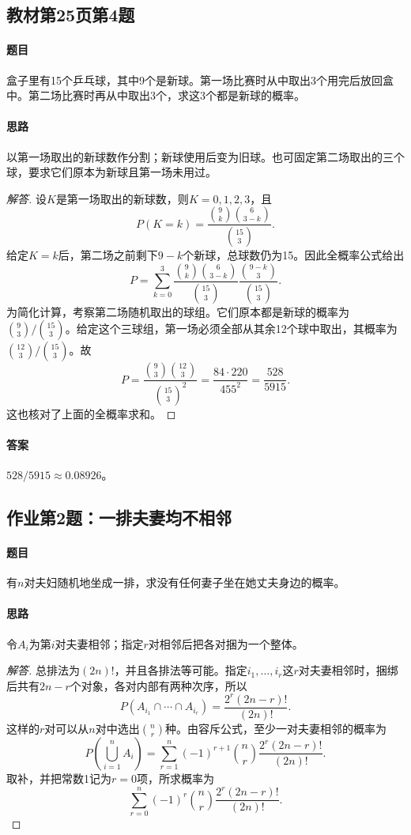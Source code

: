 \subsection{教材第25页第4题}\label{ex:w03-t254}
\paragraph{题目}
盒子里有15个乒乓球，其中9个是新球。第一场比赛时从中取出3个用完后放回盒中。第二场比赛时再从中取出3个，求这3个都是新球的概率。
\paragraph{思路}以第一场取出的新球数作分割；新球使用后变为旧球。也可固定第二场取出的三个球，要求它们原本为新球且第一场未用过。
\begin{proof}[解答]
设$K$是第一场取出的新球数，则$K=0,1,2,3$，且
\[P(K=k)=\frac{\binom9k\binom6{3-k}}{\binom{15}3}.\]
给定$K=k$后，第二场之前剩下$9-k$个新球，总球数仍为15。因此全概率公式给出
\[P=\sum_{k=0}^3\frac{\binom9k\binom6{3-k}}{\binom{15}3}
\frac{\binom{9-k}3}{\binom{15}3}.\]
为简化计算，考察第二场随机取出的球组。它们原本都是新球的概率为$\binom93/\binom{15}3$。给定这个三球组，第一场必须全部从其余12个球中取出，其概率为$\binom{12}3/\binom{15}3$。故
\[P=\frac{\binom93\binom{12}3}{\binom{15}3^2}
=\frac{84\cdot220}{455^2}=\frac{528}{5915}.\]
这也核对了上面的全概率求和。
\end{proof}
\paragraph{答案}$528/5915\approx0.08926$。

\subsection{作业第2题：一排夫妻均不相邻}\label{ex:w03-h2}
\paragraph{题目}
有$n$对夫妇随机地坐成一排，求没有任何妻子坐在她丈夫身边的概率。
\paragraph{思路}令$A_i$为第$i$对夫妻相邻；指定$r$对相邻后把各对捆为一个整体。
\begin{proof}[解答]
总排法为$(2n)!$，并且各排法等可能。指定$i_1,\ldots,i_r$这$r$对夫妻相邻时，捆绑后共有$2n-r$个对象，各对内部有两种次序，所以
\[P(A_{i_1}\cap\cdots\cap A_{i_r})=\frac{2^r(2n-r)!}{(2n)!}.\]
这样的$r$对可以从$n$对中选出$\binom nr$种。由容斥公式，至少一对夫妻相邻的概率为
\[P\left(\bigcup_{i=1}^nA_i\right)
=\sum_{r=1}^n(-1)^{r+1}\binom nr\frac{2^r(2n-r)!}{(2n)!}.\]
取补，并把常数1记为$r=0$项，所求概率为
\[\boxed{\sum_{r=0}^n(-1)^r\binom nr\frac{2^r(2n-r)!}{(2n)!}}.\]
\end{proof}

